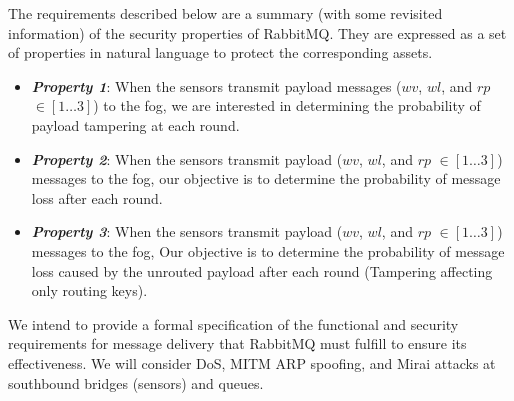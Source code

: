 The requirements described below are a summary (with some revisited information) of the security properties of RabbitMQ. They are expressed as a set of properties in natural language to protect the corresponding assets.
\begin{boxF}
\begin{itemize}
    \item \emph{\bfseries{Property 1}}: When the sensors transmit payload messages ($wv$, $wl$, and $rp$ $\in [1\ldots3]$) to the fog, we are interested in determining the probability of payload tampering at each round.
    \item \emph{\bfseries{Property 2}}: When the sensors transmit payload ($wv$, $wl$, and $rp$ $\in [1\ldots3]$) messages to the fog, our objective is to determine the probability of message loss after each round.
    \item \emph{\bfseries{Property 3}}: When the sensors transmit payload ($wv$, $wl$, and $rp$ $\in [1\ldots3]$) messages to the fog, Our objective is to determine the probability of message loss caused by the unrouted payload after each round (Tampering affecting only routing keys).
\end{itemize}
\end{boxF}
We intend to provide a formal specification of the functional and security requirements for message delivery that RabbitMQ must fulfill to ensure its effectiveness. We will consider DoS, MITM ARP spoofing, and Mirai attacks at southbound bridges (sensors) and queues. 


\subsection{}


